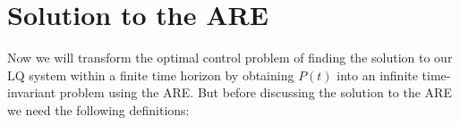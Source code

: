 \documentclass[paper=a4, pagesize, DIV=calc, BCOR=12.5mm, twoside=on, onecolumn=on, open = any, titlepage =on, parskip =half-, headsepline = on, footsepline = on, chapterprefix = on, appendixprefix = off, fontsize = 12pt, numbers = noenddot, abstract = on]{scrbook}
\numberwithin{equation}{chapter}
\theoremstyle{definition}
\theoremstyle{plain}
\theoremstyle{plain}
\theoremstyle{remark}
\theoremstyle{plain}
\theoremstyle{plain}
\begin{document}


\section{Solution to the ARE} \label{sec:solution ARE}
Now we will transform the optimal control problem of finding the solution to our LQ system within a finite time horizon by obtaining $P(t)$ into an infinite time-invariant problem using the ARE. But before discussing the solution to the ARE we need the following definitions:
\end{document}
